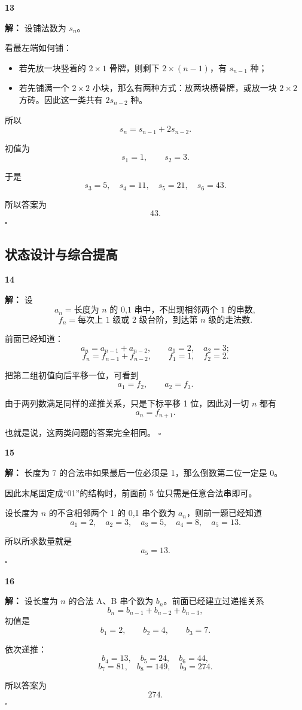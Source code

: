 \documentclass[11pt,a4paper,fontset=fandol]{ctexart}
\theoremstyle{formalexample}
\newenvironment{solution}{\par\noindent\textbf{解：}}{\hfill$\square$\par}
\begin{document}
\textbf{13}\begin{solution}
设铺法数为 $s_n$。

看最左端如何铺：
\begin{itemize}
  \item 若先放一块竖着的 $2\times 1$ 骨牌，则剩下 $2\times (n-1)$，有 $s_{n-1}$ 种；
  \item 若先铺满一个 $2\times 2$ 小块，那么有两种方式：放两块横骨牌，或放一块 $2\times 2$ 方砖。因此这一类共有 $2s_{n-2}$ 种。
\end{itemize}

所以
\[
  s_n=s_{n-1}+2s_{n-2}.
\]

初值为
\[
  s_1=1,
  \qquad
  s_2=3.
\]

于是
\[
  s_3=5,
  \quad
  s_4=11,
  \quad
  s_5=21,
  \quad
  s_6=43.
\]

所以答案为
\[
  43.
\]
\end{solution}

\subsection*{状态设计与综合提高}

\textbf{14}\begin{solution}
设
\[
  a_n=\text{长度为 $n$ 的 0,1 串中，不出现相邻两个 1 的串数},
\]
\[
  f_n=\text{每次上 1 级或 2 级台阶，到达第 $n$ 级的走法数}.
\]

前面已经知道：
\[
  a_n=a_{n-1}+a_{n-2},
  \qquad
  a_1=2,
  \quad
  a_2=3;
\]
\[
  f_n=f_{n-1}+f_{n-2},
  \qquad
  f_1=1,
  \quad
  f_2=2.
\]

把第二组初值向后平移一位，可看到
\[
  a_1=f_2,
  \qquad
  a_2=f_3.
\]

由于两列数满足同样的递推关系，只是下标平移 1 位，因此对一切 $n$ 都有
\[
  a_n=f_{n+1}.
\]

也就是说，这两类问题的答案完全相同。
\end{solution}

\textbf{15}\begin{solution}
长度为 7 的合法串如果最后一位必须是 1，那么倒数第二位一定是 0。

因此末尾固定成“01”的结构时，前面前 5 位只需是任意合法串即可。

设长度为 $n$ 的不含相邻两个 1 的 0,1 串个数为 $a_n$，则前一题已经知道
\[
  a_1=2,
  \quad
  a_2=3,
  \quad
  a_3=5,
  \quad
  a_4=8,
  \quad
  a_5=13.
\]

所以所求数量就是
\[
  a_5=13.
\]
\end{solution}

\textbf{16}\begin{solution}
设长度为 $n$ 的合法 A、B 串个数为 $b_n$。前面已经建立过递推关系
\[
  b_n=b_{n-1}+b_{n-2}+b_{n-3},
\]
初值是
\[
  b_1=2,
  \qquad
  b_2=4,
  \qquad
  b_3=7.
\]

依次递推：
\[
  b_4=13,
  \quad
  b_5=24,
  \quad
  b_6=44,
\]
\[
  b_7=81,
  \quad
  b_8=149,
  \quad
  b_9=274.
\]

所以答案为
\[
  274.
\]
\end{solution}
\end{document}
